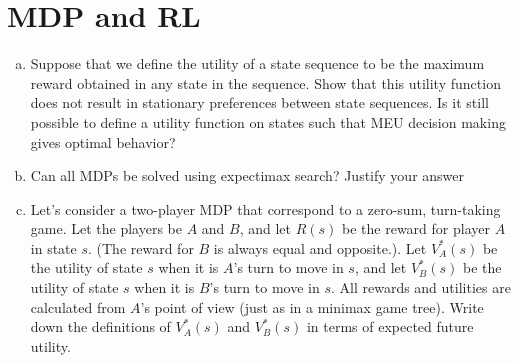\documentclass[a4paper]{article}
\begin{document}
\section{MDP and RL}

\begin{enumerate}[(a)]
\item Suppose that we define the utility of a state sequence to be the maximum reward obtained in any state in the sequence. Show that this utility function does not result in stationary preferences between state sequences. Is it still possible to define a utility function on states such that MEU decision making gives optimal behavior?


\vspace{25em}

\item Can all MDPs be solved using expectimax search? Justify your answer

\vspace{8em}

\item Let's consider a two-player MDP that correspond to a zero-sum, turn-taking game. Let the players be $A$ and $B$, and let $R(s)$ be the reward for player $A$ in state $s$. (The reward for $B$ is always equal and opposite.). Let $V^*_A(s)$ be the utility of state $s$ when it is $A$’s turn to move in $s$, and let $V^*_B(s)$ be the utility of state $s$ when it is $B$’s turn to move in $s$. All rewards and utilities are calculated from $A$’s point of view (just as in a minimax game tree). Write down the definitions of $V^*_A(s)$ and $V^*_B(s)$ in terms of expected future utility. 


\end{enumerate}
\end{document}
